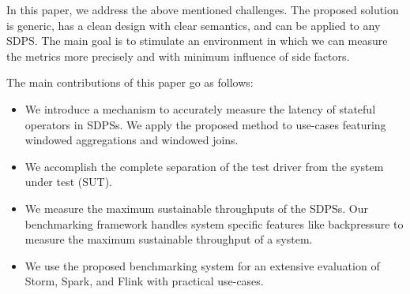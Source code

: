 
In this paper, we address the above mentioned challenges. The proposed solution is generic, has a clean design with clear semantics, and can be applied to any SDPS. The main goal is to stimulate an environment in which we can measure the metrics more precisely and with minimum influence of side factors.

The main contributions of this paper go as follows:
\begin{itemize}  
\item We    introduce a mechanism to accurately measure the latency of stateful operators in SDPSs. We apply the proposed method to use-cases featuring windowed aggregations and windowed joins. 
\item We accomplish the complete separation of the test driver from the system under test (SUT). 
\item We measure the maximum sustainable throughputs of the SDPSs. Our benchmarking framework handles system specific features like backpressure to measure the maximum sustainable throughput of a system. 
\item We use the proposed benchmarking system for an extensive evaluation of Storm, Spark, and Flink with practical use-cases.
\end{itemize}

